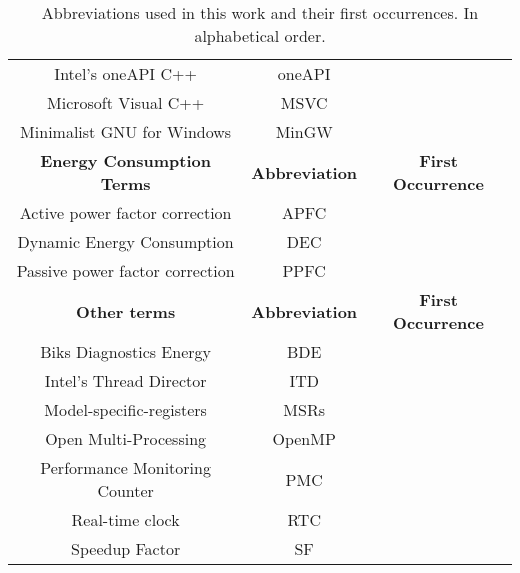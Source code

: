 \begin{table}[H]
\begin{tabular}{|| c | c | c ||}
    Intel's oneAPI C++ & oneAPI &\\
    Microsoft Visual C++ & MSVC &\\
    Minimalist GNU for Windows & MinGW &\\
    \hline
    \textbf{Energy Consumption Terms} & \textbf{Abbreviation} & \textbf{First Occurrence} \\\hline
    Active power factor correction & APFC &\\
    Dynamic Energy Consumption & DEC &\\
    Passive power factor correction & PPFC  &\\\hline
    \textbf{Other terms} & \textbf{Abbreviation} & \textbf{First Occurrence} \\\hline
    Biks Diagnostics Energy & BDE &\\
    Intel's Thread Director & ITD &\\
    Model-specific-registers & MSRs &\\
    Open Multi-Processing & OpenMP &\\
    Performance Monitoring Counter & PMC &\\
    Real-time clock & RTC &\\
    Speedup Factor & SF &\\
    \hline
    \end{tabular}
    \caption{Abbreviations used in this work and their first occurrences. In alphabetical order.}
    \label{tab:abbreviations}
\end{table}